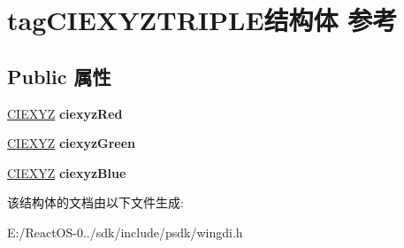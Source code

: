 \hypertarget{structtag_c_i_e_x_y_z_t_r_i_p_l_e}{}\section{tag\+C\+I\+E\+X\+Y\+Z\+T\+R\+I\+P\+L\+E结构体 参考}
\label{structtag_c_i_e_x_y_z_t_r_i_p_l_e}
\subsection*{Public 属性}
\begin{DoxyCompactItemize}
\item 
\mbox{\label{structtag_c_i_e_x_y_z_t_r_i_p_l_e_af0510971e873741abb80afa1fd6708f3}} 
\hyperlink{structtag_c_i_e_x_y_z}{C\+I\+E\+X\+YZ} {\bfseries ciexyz\+Red}
\item 
\mbox{\label{structtag_c_i_e_x_y_z_t_r_i_p_l_e_ab5a986eecd86645cb40ce740bde79a48}} 
\hyperlink{structtag_c_i_e_x_y_z}{C\+I\+E\+X\+YZ} {\bfseries ciexyz\+Green}
\item 
\mbox{\label{structtag_c_i_e_x_y_z_t_r_i_p_l_e_a51ef023af9c745d1d4b7a91aa4b0e8ac}} 
\hyperlink{structtag_c_i_e_x_y_z}{C\+I\+E\+X\+YZ} {\bfseries ciexyz\+Blue}
\end{DoxyCompactItemize}


该结构体的文档由以下文件生成\+:\begin{DoxyCompactItemize}
\item 
E\+:/\+React\+O\+S-\/0../sdk/include/psdk/wingdi.\+h\end{DoxyCompactItemize}
